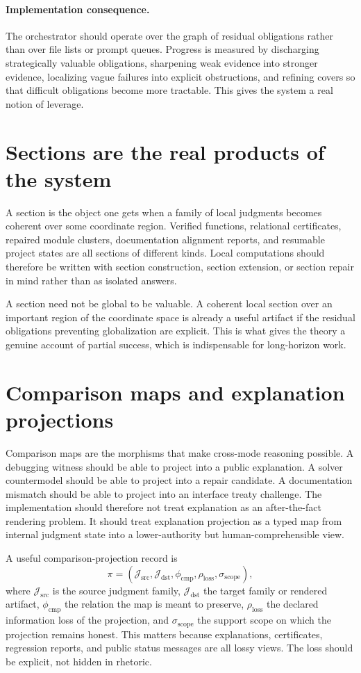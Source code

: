 \documentclass[11pt]{report}
\begin{document}
\paragraph{Implementation consequence.}
The orchestrator should operate over the graph of residual obligations rather than over file lists or prompt queues. Progress is measured by discharging strategically valuable obligations, sharpening weak evidence into stronger evidence, localizing vague failures into explicit obstructions, and refining covers so that difficult obligations become more tractable. This gives the system a real notion of leverage.
\section{Sections are the real products of the system}
A section is the object one gets when a family of local judgments becomes coherent over some coordinate region. Verified functions, relational certificates, repaired module clusters, documentation alignment reports, and resumable project states are all sections of different kinds. Local computations should therefore be written with section construction, section extension, or section repair in mind rather than as isolated answers.

A section need not be global to be valuable. A coherent local section over an important region of the coordinate space is already a useful artifact if the residual obligations preventing globalization are explicit. This is what gives the theory a genuine account of partial success, which is indispensable for long-horizon work.
\section{Comparison maps and explanation projections}
Comparison maps are the morphisms that make cross-mode reasoning possible. A debugging witness should be able to project into a public explanation. A solver countermodel should be able to project into a repair candidate. A documentation mismatch should be able to project into an interface treaty challenge. The implementation should therefore not treat explanation as an after-the-fact rendering problem. It should treat explanation projection as a typed map from internal judgment state into a lower-authority but human-comprehensible view.

A useful comparison-projection record is
\[
\pi = (\mathcal{J}_{\mathrm{src}}, \mathcal{J}_{\mathrm{dst}}, \phi_{\mathrm{cmp}}, \rho_{\mathrm{loss}}, \sigma_{\mathrm{scope}}),
\]
where $\mathcal{J}_{\mathrm{src}}$ is the source judgment family, $\mathcal{J}_{\mathrm{dst}}$ the target family or rendered artifact, $\phi_{\mathrm{cmp}}$ the relation the map is meant to preserve, $\rho_{\mathrm{loss}}$ the declared information loss of the projection, and $\sigma_{\mathrm{scope}}$ the support scope on which the projection remains honest. This matters because explanations, certificates, regression reports, and public status messages are all lossy views. The loss should be explicit, not hidden in rhetoric.
\end{document}

